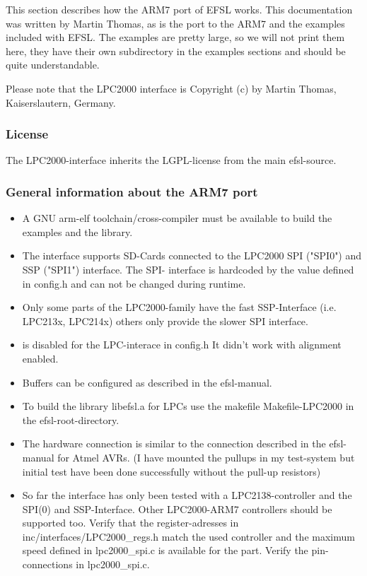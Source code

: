 This section describes how the ARM7 port of EFSL works. This documentation was written
by Martin Thomas, as is the port to the ARM7 and the examples included with EFSL.
The examples are pretty large, so we will not print them here, they have their own
subdirectory in the examples sections and should be quite understandable.

Please note that the LPC2000 interface is Copyright (c) by Martin Thomas, Kaiserslautern, Germany.

\subsubsection{License}
The LPC2000-interface inherits the 
LGPL-license from the main efsl-source.


\subsubsection{General information about the ARM7 port}
	\begin{itemize}
\item A GNU arm-elf toolchain/cross-compiler
must be available to build the examples
and the library.

\item The interface supports SD-Cards
connected to the LPC2000 SPI ("SPI0") 
and SSP ("SPI1") interface. The SPI-
interface is hardcoded by the value 
defined in config.h and can not be 
changed during runtime.

\item Only some parts of the LPC2000-family
have the fast SSP-Interface (i.e. LPC213x,
LPC214x) others only provide the slower 
SPI interface.

\item {} is disabled
for the LPC-interace in config.h 
It didn't work with alignment enabled.

\item Buffers can be configured as
described in the efsl-manual.

\item To build the library libefsl.a for 
LPCs use the makefile Makefile-LPC2000 
in the efsl-root-directory.

\item The hardware connection is similar 
to the connection described
in the efsl-manual for Atmel AVRs.
(I have mounted the pullups in my
test-system but initial test have
been done successfully without the
pull-up resistors)

\item So far the interface has only been
tested with a LPC2138-controller
and the SPI(0) and SSP-Interface.
Other LPC2000-ARM7 controllers 
should be supported too. Verify
that the register-adresses in 
inc/interfaces/LPC2000\_regs.h
match the used controller and the
maximum speed defined in lpc2000\_spi.c
is available for the part.
Verify the pin-connections in lpc2000\_spi.c.
	\end{itemize}

